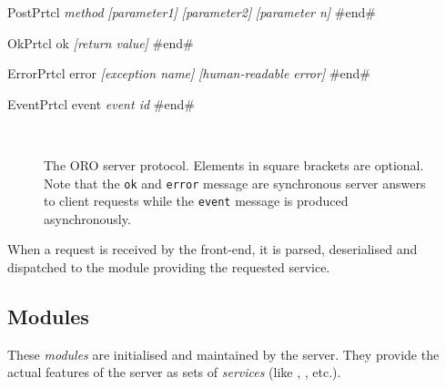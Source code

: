 \begin{SaveVerbatim}[frame=single, commandchars=\\\{\}]{PostPrtcl}
\emph{method}
\emph{[parameter1]}
\emph{[parameter2]}
\emph{[parameter n]}
#end#
\end{SaveVerbatim}

\begin{SaveVerbatim}[frame=single, commandchars=\\\{\}]{OkPrtcl}
ok
\emph{[return value]}
#end#
\end{SaveVerbatim}

\begin{SaveVerbatim}[frame=single, commandchars=\\\{\}]{ErrorPrtcl}
error
\emph{[exception name]}
\emph{[human-readable error]}
#end#
\end{SaveVerbatim}

\begin{SaveVerbatim}[frame=single, commandchars=\\\{\}]{EventPrtcl}
event
\emph{event id}
#end#
\end{SaveVerbatim}

\begin{figure}
\centering

 \\

\caption{The ORO server protocol. Elements in square brackets are optional.
Note that the {\tt ok} and {\tt error} message are synchronous server answers
to client requests while the {\tt event} message is produced asynchronously.}

\label{fig|oro-protocol}

\end{figure}

When a request is received by the front-end, it is parsed, deserialised and
dispatched to the module providing the requested service.

\subsection{Modules}

These \emph{modules} are initialised and maintained by the server. They provide
the actual features of the server as sets of \emph{services} (like ,
, etc.).

